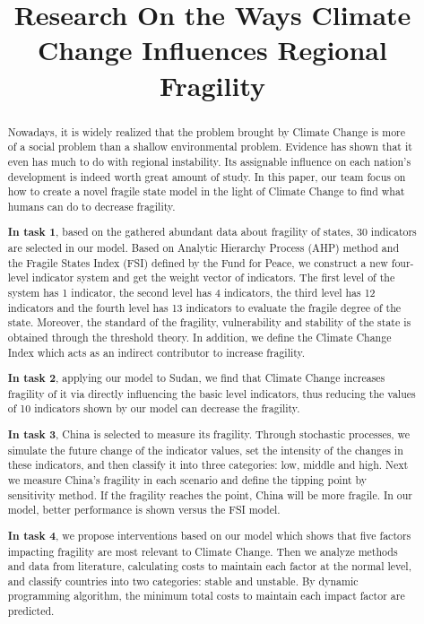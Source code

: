 \documentclass[a4paper,12pt]{article}
\title{Research On the Ways Climate Change Influences Regional Fragility}  %
\begin{document}
\begin{abstract}\footnotesize
Nowadays, it is widely realized that the problem brought by Climate Change is more of a social problem than a shallow environmental problem. Evidence has shown that it even has much to do with regional instability. Its assignable influence on each nation's development is indeed worth great amount of study. In this paper, our team focus on how to create a novel fragile state model in the light of Climate Change to find what humans can do to decrease fragility. 

\textbf{In task 1}, based on the gathered abundant data about fragility of states, 30 indicators are selected in our model. Based on Analytic Hierarchy Process (AHP) method and the Fragile States Index (FSI) defined by the Fund for Peace, we construct a new four-level indicator system and get the weight vector of indicators. The first level of the system has 1 indicator, the second level has 4 indicators, the third level has 12 indicators and the fourth level has 13 indicators to evaluate the fragile degree of the state. Moreover, the standard of the fragility, vulnerability and stability of the state is obtained through the threshold theory. In addition, we define the Climate Change Index which acts as an indirect contributor to increase fragility. 

\textbf{In task 2}, applying our model to Sudan, we find that Climate Change increases fragility of it via directly influencing the basic level indicators, thus reducing the values of 10 indicators shown by our model can decrease the fragility.

\textbf{In task 3}, China is selected to measure its fragility. Through stochastic processes, we simulate the future change of the indicator values, set the intensity of the changes in these indicators, and then classify it into three categories: low, middle and high. Next we measure China's fragility in each scenario and define the tipping point by sensitivity method. If the fragility reaches the point, China will be more fragile. In our model, better performance is shown versus the FSI model.

\textbf{In task 4}, we propose interventions based on our model which shows that five factors impacting fragility are most relevant to Climate Change. Then we analyze methods and data from literature, calculating costs to maintain each factor at the normal level, and classify countries into two categories: stable and unstable. By dynamic programming algorithm, the minimum total costs to maintain each impact factor are predicted.


\end{abstract}
\end{document}

